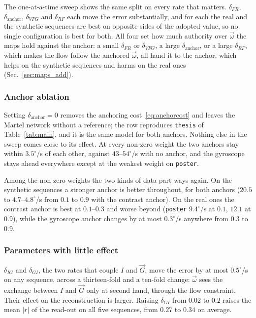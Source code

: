 \documentclass[journal]{IEEEtran}
\newcommand{\Imap}{I}
\newcommand{\Gmap}{\vec{G}}
\newcommand{\wvec}{\vec{\omega}}
\begin{document}
The one-at-a-time sweep shows the same split on every rate that matters. $\delta_{F\!R}$, $\delta_{\text{anchor}}$, $\delta_{V\!F\!G}$ and $\delta_{R\!F}$ each move the error substantially, and for each the real and the synthetic sequences are best on opposite sides of the adopted value, so no single configuration is best for both. All four set how much authority over $\wvec$ the maps hold against the anchor: a small $\delta_{F\!R}$ or $\delta_{V\!F\!G}$, a large $\delta_{\text{anchor}}$, or a large $\delta_{R\!F}$, which makes the flow follow the anchored $\wvec$, all hand it to the anchor, which helps on the synthetic sequences and harms on the real ones (Sec.~\ref{sec:maps_add}).

\subsubsection{Anchor ablation}
Setting $\delta_{\text{anchor}} = 0$ removes the anchoring cost~\eqref{eq:anchorcost} and leaves the Martel network without a reference; the row reproduces \texttt{thesis} of Table~\ref{tab:main}, and it is the same model for both anchors. Nothing else in the sweep comes close to its effect. At every non-zero weight the two anchors stay within $3.5^\circ$/s of each other, against $43$--$54^\circ$/s with no anchor, and the gyroscope stays ahead everywhere except at the weakest weight on \texttt{poster}. 

Among the non-zero weights the two kinds of data part ways again. On the synthetic sequences a stronger anchor is better throughout, for both anchors ($20.5$ to $4.7$--$4.8^\circ$/s from $0.1$ to $0.9$ with the contrast anchor). On the real ones the contrast anchor is best at $0.1$--$0.3$ and worse beyond (\texttt{poster} $9.4^\circ$/s at $0.1$, $12.1$ at $0.9$), while the gyroscope anchor changes by at most $0.3^\circ$/s anywhere from $0.3$ to $0.9$.

\subsubsection{Parameters with little effect}
\label{sec:other_deltas}
$\delta_{I\!G}$ and $\delta_{G\!I}$, the two rates that couple $\Imap$ and $\Gmap$, move the error by at most $0.5^\circ$/s on any sequence, across a thirteen-fold and a ten-fold change: $\wvec$ sees the exchange between $\Imap$ and $\Gmap$ only at second hand, through the flow constraint. Their effect on the reconstruction is larger. Raising $\delta_{G\!I}$ from $0.02$ to $0.2$ raises the mean $|r|$ of the read-out on all five sequences, from $0.27$ to $0.34$ on average.
\end{document}
